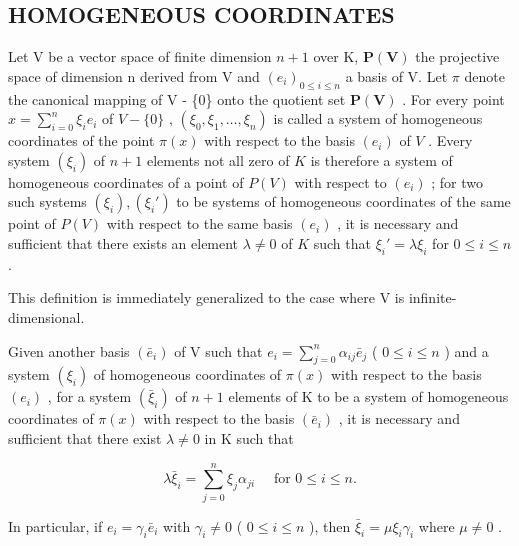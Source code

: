 \subsection{HOMOGENEOUS COORDINATES}

Let V be a vector space of finite dimension \(n + 1\) over K, \(\mathbf{P}(\mathbf{V})\) the projective space of dimension n derived from V and \((e_{i})_{0 \leqslant i \leqslant n}\) a basis of V. Let \(\pi\) denote the canonical mapping of V - \{0\} onto the quotient set \(\mathbf{P}(\mathbf{V})\) . For every point \(x = \sum_{i=0}^{n} \xi_i e_i\) of \(V - \{0\}\) , \((\xi_0, \xi_1, \ldots, \xi_n)\) is called a system of homogeneous coordinates of the point \(\pi(x)\) with respect to the basis \((e_i)\) of \(V\) . Every system \((\xi_i)\) of \(n + 1\) elements not all zero of \(K\) is therefore a system of homogeneous coordinates of a point of \(P(V)\) with respect to \((e_i)\) ; for two such systems \((\xi_i), (\xi_i')\) to be systems of homogeneous coordinates of the same point of \(P(V)\) with respect to the same basis \((e_i)\) , it is necessary and sufficient that there exists an element \(\lambda \neq 0\) of \(K\) such that \(\xi_i' = \lambda \xi_i\) for \(0 \leqslant i \leqslant n\) .

This definition is immediately generalized to the case where V is infinite-dimensional.

Given another basis \((\bar{e}_i)\) of V such that \(e_i = \sum_{j=0}^{n} \alpha_{ij} \bar{e}_j\) ( \(0 \leqslant i \leqslant n\) ) and a system \((\xi_i)\) of homogeneous coordinates of \(\pi(x)\) with respect to the basis \((e_i)\) , for a system \((\bar{\xi}_i)\) of \(n+1\) elements of K to be a system of homogeneous coordinates of \(\pi(x)\) with respect to the basis \((\bar{e}_i)\) , it is necessary and sufficient that there exist \(\lambda \neq 0\) in K such that

\[
\lambda \bar {\xi} _ {i} = \sum_ {j = 0} ^ {n} \xi_ {j} \alpha_ {j i} \quad \text { for } 0 \leqslant i \leqslant n.
\]

In particular, if \(e_i = \gamma_i \bar{e}_i\) with \(\gamma_i \neq 0\) ( \(0 \leqslant i \leqslant n\) ), then \(\bar{\xi}_i = \mu \xi_i \gamma_i\) where \(\mu \neq 0\) .

